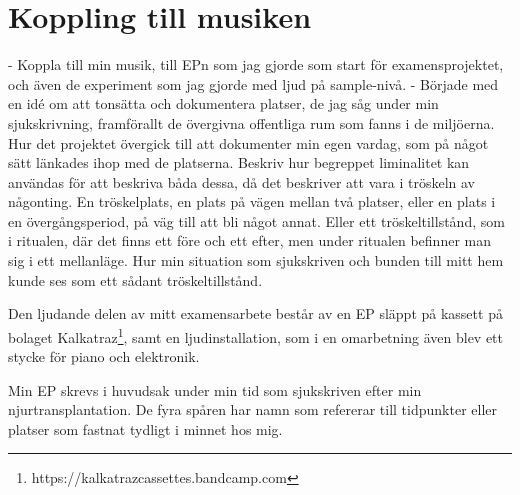 \documentclass{article}
\begin{document}



\section{Koppling till musiken}
- Koppla till min musik, till EPn som jag gjorde som start för examensprojektet, och även de experiment som
  jag gjorde med ljud på sample-nivå. 
- Började med en idé om att tonsätta och dokumentera platser, de jag såg under min sjukskrivning, framförallt
  de övergivna offentliga rum som fanns i de miljöerna. Hur det projektet övergick till att dokumenter min
  egen vardag, som på något sätt länkades ihop med de platserna. Beskriv hur begreppet
  liminalitet kan användas för att beskriva båda dessa, då det beskriver att vara i
  tröskeln av någonting. En tröskelplats, en plats på vägen mellan två platser, eller en plats i en
  övergångsperiod, på väg till att bli något annat. Eller ett tröskeltillstånd, som i ritualen, där det finns
  ett före och ett efter, men under ritualen befinner man sig i ett mellanläge. Hur min situation som
  sjukskriven och bunden till mitt hem kunde ses som ett sådant tröskeltillstånd.

  Den ljudande delen av mitt examensarbete består av en EP släppt på kassett på bolaget
  Kalkatraz\footnote{https://kalkatrazcassettes.bandcamp.com}, samt en ljudinstallation, som i en omarbetning även blev
  ett stycke för piano och elektronik.

  Min EP skrevs i huvudsak under min tid som sjukskriven efter min njurtransplantation. De fyra spåren har
  namn som refererar till tidpunkter eller platser som fastnat tydligt i minnet hos mig. 
\end{document}
